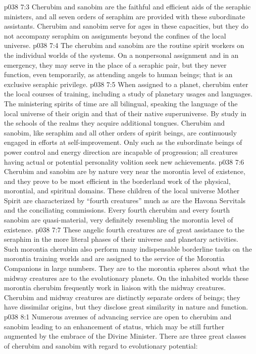 \pc \vs p038 7:3 Cherubim and sanobim are the faithful and efficient aids of the seraphic ministers, and all seven orders of seraphim are provided with these subordinate assistants. Cherubim and sanobim serve for ages in these capacities, but they do not accompany seraphim on assignments beyond the confines of the local universe.
\vs p038 7:4 The cherubim and sanobim are the routine spirit workers on the individual worlds of the systems. On a nonpersonal assignment and in an emergency, they may serve in the place of a seraphic pair, but they never function, even temporarily, as attending angels to human beings; that is an exclusive seraphic privilege.
\pc \vs p038 7:5 When assigned to a planet, cherubim enter the local courses of training, including a study of planetary usages and languages. The ministering spirits of time are all bilingual, speaking the language of the local universe of their origin and that of their native superuniverse. By study in the schools of the realms they acquire additional tongues. Cherubim and sanobim, like seraphim and all other orders of spirit beings, are continuously engaged in efforts at self\hyp{}improvement. Only such as the subordinate beings of power control and energy direction are incapable of progression; all creatures having actual or potential personality volition seek new achievements.
\pc \vs p038 7:6 Cherubim and sanobim are by nature very near the morontia level of existence, and they prove to be most efficient in the borderland work of the physical, morontial, and spiritual domains. These children of the local universe Mother Spirit are characterized by “fourth creatures” much as are the Havona Servitals and the conciliating commissions. Every fourth cherubim and every fourth sanobim are quasi\hyp{}material, very definitely resembling the morontia level of existence.
\vs p038 7:7 These angelic fourth creatures are of great assistance to the seraphim in the more literal phases of their universe and planetary activities. Such morontia cherubim also perform many indispensable borderline tasks on the morontia training worlds and are assigned to the service of the Morontia Companions in large numbers. They are to the morontia spheres about what the midway creatures are to the evolutionary planets. On the inhabited worlds these morontia cherubim frequently work in liaison with the midway creatures. Cherubim and midway creatures are distinctly separate orders of beings; they have dissimilar origins, but they disclose great similarity in nature and function.
\vs p038 8:1 Numerous avenues of advancing service are open to cherubim and sanobim leading to an enhancement of status, which may be still further augmented by the embrace of the Divine Minister. There are three great classes of cherubim and sanobim with regard to evolutionary potential:\plusone
